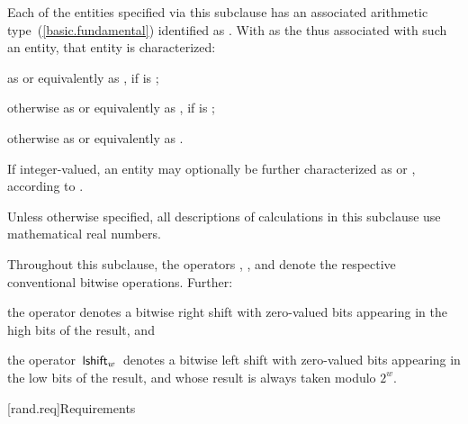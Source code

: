 \pnum
{}%
Each of the entities specified via this subclause
has an associated arithmetic type~(\ref{basic.fundamental})
identified as .
With  as the 
thus associated with such an entity,
that entity is characterized:
\begin{enumeratea}
 \item
   as  or equivalently as ,
   if  is ;
 \item
   otherwise
   as  or equivalently as ,
   if  is ;
 \item
   otherwise
   as  or equivalently as .
\end{enumeratea}
\noindent
If integer-valued,
an entity may optionally be further characterized as
 or ,
according to .

\pnum
Unless otherwise specified,
all descriptions of calculations
in this subclause
use mathematical real numbers.

\pnum
Throughout this subclause,
the operators
\bitand, \bitor, and \xor
denote the respective conventional bitwise operations.
Further:

\begin{enumeratea}
 \item
   the operator \rightshift\xspace
   denotes a bitwise right shift
   with zero-valued bits appearing in the high bits of the result,
 and
 \item
   the operator $ \, \mathsf{lshift}_w \, $
   denotes a bitwise left shift
   with zero-valued bits appearing in the low bits of the result,
   and whose result is always taken modulo $2^w$.
\end{enumeratea}



[rand.req]{Requirements}%


